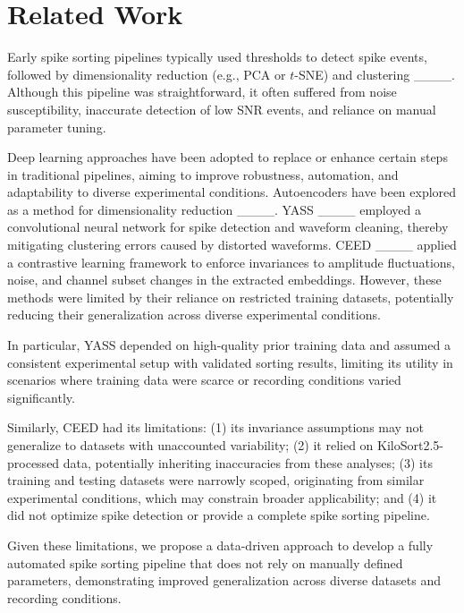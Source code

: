 \section{Related Work}
Early spike sorting pipelines typically used thresholds to detect spike events, followed by dimensionality reduction (e.g., PCA or $t$-SNE) and clustering ____. Although this pipeline was straightforward, it often suffered from noise susceptibility, inaccurate detection of low SNR events, and reliance on manual parameter tuning.

Deep learning approaches have been adopted to replace or enhance certain steps in traditional pipelines, aiming to improve robustness, automation, and adaptability to diverse experimental conditions. Autoencoders have been explored as a method for dimensionality reduction ____. YASS ____ employed a convolutional neural network for spike detection and waveform cleaning, thereby mitigating clustering errors caused by distorted waveforms. CEED ____ applied a contrastive learning framework to enforce invariances to amplitude fluctuations, noise, and channel subset changes in the extracted embeddings. However, these methods were limited by their reliance on restricted training datasets, potentially reducing their generalization across diverse experimental conditions.

In particular, YASS depended on high-quality prior training data and assumed a consistent experimental setup with validated sorting results, limiting its utility in scenarios where training data were scarce or recording conditions varied significantly. 

Similarly, CEED had its limitations: (1) its invariance assumptions may not generalize to datasets with unaccounted variability; (2) it relied on KiloSort2.5-processed data, potentially inheriting inaccuracies from these analyses; (3) its training and testing datasets were narrowly scoped, originating from similar experimental conditions, which may constrain broader applicability; and (4) it did not optimize spike detection or provide a complete spike sorting pipeline.

Given these limitations, we propose a data-driven approach to develop a fully automated spike sorting pipeline that does not rely on manually defined parameters, demonstrating improved generalization across diverse datasets and recording conditions.